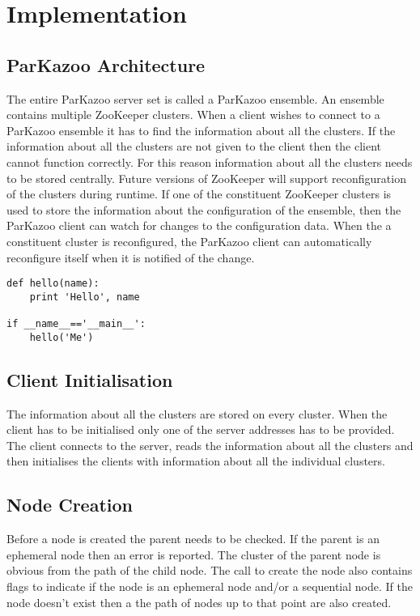 \chapter{Implementation}

\section{ParKazoo Architecture}
  The entire ParKazoo server set is called a ParKazoo ensemble. An ensemble contains multiple ZooKeeper clusters. When a client wishes to connect to a ParKazoo ensemble it has to find the information about all the clusters. If the information about all the clusters are not given to the client then the client cannot function correctly. For this reason information about all the clusters needs to be stored centrally. Future versions of ZooKeeper will support reconfiguration of the clusters during runtime. If one of the constituent ZooKeeper clusters is used to store the information about the configuration of the ensemble, then the ParKazoo client can watch for changes to the configuration data. When the a constituent cluster is reconfigured, the ParKazoo client can automatically reconfigure itself when it is notified of the change. 


  
\begin{lstlisting}
def hello(name):
    print 'Hello', name
 
if __name__=='__main__':
    hello('Me')    
\end{lstlisting}

\section{Client Initialisation}
    The information about all the clusters are stored on every cluster. When the client has to be initialised only one of the server addresses has to be provided. The client connects to the server, reads the information about all the clusters and then initialises the clients with information about all the individual clusters.

\section{Node Creation}
Before a node is created the parent needs to be checked. If the parent is an ephemeral node then an error is reported. The cluster of the parent node is obvious from the path of the child node. The call to create the node also contains flags to indicate if the node is an ephemeral node and/or a sequential node. If the node doesn't exist then a the path of nodes up to that point are also created.


